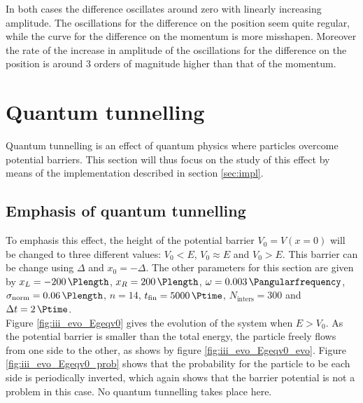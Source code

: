 \documentclass[a4paper,12pt,twoside]{article}
\begin{document}
In both cases the difference oscillates around zero with linearly increasing amplitude. The oscillations for the difference on the position seem quite regular, while the curve for the difference on the momentum is more misshapen. Moreover the rate of the increase in amplitude of the oscillations for the difference on the position is around 3 orders of magnitude higher than that of the momentum.


\newpage
\section{Quantum tunnelling}\label{sec:quantum_tunnelling}
  Quantum tunnelling is an effect of quantum physics where particles overcome potential barriers. \cite{wiki:quantum_tunnelling}
  This section will thus focus on the study of this effect by means of the implementation described in section \ref{sec:impl}.\\

  \subsection{Emphasis of quantum tunnelling}
    To emphasis this effect, the height of the potential barrier $V_0 = V(x=0)$ will be changed to three different values: $V_0<E$, $V_0 \approx E$ and $V_0>E$.
    This barrier can be change using $\Delta$ and $x_0 = -\Delta$.
    The other parameters for this section are given by $x_L=\SI{-200}{\Plength}$, $x_R=\SI{200}{\Plength}$, $\omega = \SI{0.003}{\Pangularfrequency}$, $\sigma_\text{norm} = \SI{0.06}{\Plength}$, $n=14$, $t_\text{fin} = \SI{5000}{\Ptime}$, $N_\text{inters} = 300$ and $\Delta t = \SI{2}{\Ptime}$.\\

    Figure \ref{fig:iii_evo_Egeqv0} gives the evolution of the system when $E > V_0$.
    As the potential barrier is smaller than the total energy, the particle freely flows from one side to the other, as shows by figure \ref{fig:iii_evo_Egeqv0_evo}.
    Figure \ref{fig:iii_evo_Egeqv0_prob} shows that the probability for the particle to be each side is periodically inverted, which again shows that the barrier potential is not a problem in this case.
    No quantum tunnelling takes place here.\\
\end{document}
